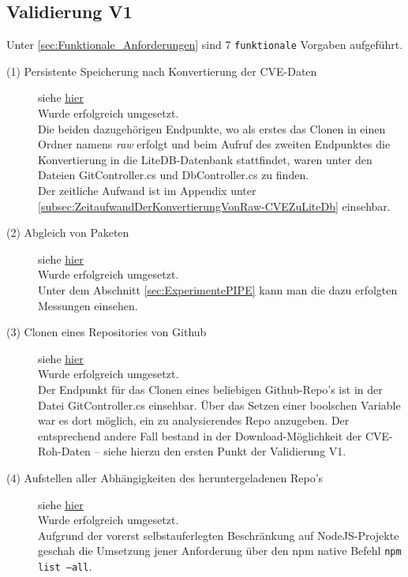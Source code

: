 \subsection{Validierung V1} \label{sec:Vali1}
    Unter \ref{sec:Funktionale_Anforderungen}  sind 7 \texttt{funktionale} Vorgaben aufgeführt.

    \begin{description}
        \item[(1) Persistente Speicherung nach Konvertierung der \ac{CVE}-Daten] siehe \hyperref[f:one]{\underline{hier}} \hfill \\
            Wurde erfolgreich umgesetzt.
            \\
            Die beiden dazugehörigen Endpunkte, wo als erstes das Clonen in einen Ordner namens \textit{raw} erfolgt und beim Aufruf des zweiten Endpunktes die Konvertierung in die LiteDB-Datenbank stattfindet, waren unter den Dateien GitController.cs und DbController.cs zu finden.
            \\
            Der zeitliche Aufwand ist im Appendix unter \ref{subsec:ZeitaufwandDerKonvertierungVonRaw-CVEZuLiteDb} einsehbar.
        \item[(2) Abgleich von Paketen] siehe \hyperref[f:two]{\underline{hier}} \hfill \\
            Wurde erfolgreich umgesetzt.
            \\
            Unter dem Abschnitt \ref{sec:ExperimentePIPE}  kann man die dazu erfolgten Messungen einsehen.
        \item[(3) Clonen eines Repositories von Github] siehe \hyperref[f:three]{\underline{hier}} \hfill \\
            Wurde erfolgreich umgesetzt.
            \\
            Der Endpunkt für das Clonen eines beliebigen Github-Repo's ist in der Datei GitController.cs einsehbar.
            Über das Setzen einer boolschen Variable war es dort möglich, ein zu analysierendes Repo anzugeben.
            Der entsprechend andere Fall bestand in der Download-Möglichkeit der \ac{CVE}-Roh-Daten -- siehe hierzu den ersten Punkt der Validierung V1.
        \item[(4) Aufstellen aller Abhängigkeiten des heruntergeladenen Repo's] siehe \hyperref[f:four]{\underline{hier}} \hfill \\
            Wurde erfolgreich umgesetzt.
            \\
            Aufgrund der vorerst selbstauferlegten Beschränkung auf NodeJS-Projekte geschah die Umsetzung jener Anforderung über den npm native Befehl \texttt{npm list --all}.

\end{description}

